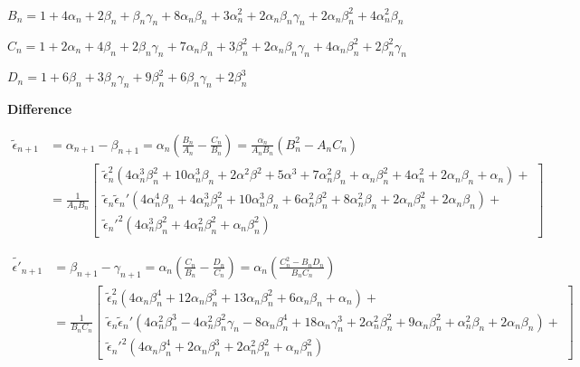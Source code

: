 $B_n = 1 + 4\alpha_n + 2\beta_n + \beta_n\gamma_n + 8\alpha_n\beta_n + 3\alpha_n^2 + 2\alpha_n\beta_n\gamma_n + 2\alpha_n\beta_n^2 + 4\alpha_n^2\beta_n$

$C_n = 1 + 2\alpha_n + 4\beta_n + 2\beta_n\gamma_n + 7\alpha_n\beta_n + 3\beta_n^2 + 2\alpha_n\beta_n\gamma_n + 4\alpha_n\beta_n^2 + 2\beta_n^2\gamma_n$


$D_n = 1 + 6\beta_n + 3\beta_n\gamma_n + 9\beta_n^2 + 6\beta_n\gamma_n + 2\beta_n^3$

\newpage

\textbf{Difference}

\begin{align*}
\tilde{\epsilon}_{n+1} &= \alpha_{n+1} - \beta_{n+1} = \alpha_n\left( \frac{B_n}{A_n} - \frac{C_n}{B_n} \right) = \frac{\alpha_n}{A_nB_n}\left( B_n^2 - A_nC_n \right)\\
&= \frac{1}{A_nB_n}\left[ 
\begin{array}{l}
\tilde{\epsilon}_n^2
(4\alpha_n^3\beta_n^2 + 10\alpha_n^3\beta_n + 2\alpha^2\beta^2 + 5\alpha^3
+ 7\alpha_n^2\beta_n + \alpha_n\beta_n^2 + 4\alpha_n^2 + 2\alpha_n\beta_n + \alpha_n)+\\
\tilde{\epsilon}_n\tilde{\epsilon}_n'
(4\alpha_n^4\beta_n + 4\alpha_n^3\beta_n^2 + 10\alpha_n^3\beta_n + 6\alpha_n^2\beta_n^2+
8\alpha_n^2\beta_n + 2\alpha_n\beta_n^2 + 2\alpha_n\beta_n)+\\
\tilde{\epsilon}_n'^2
(4\alpha_n^3\beta_n^2 + 4\alpha_n^2\beta_n^2 + \alpha_n\beta_n^2)
\end{array}\right]
\end{align*}

\begin{align*}
\tilde{\epsilon'}_{n+1} &= \beta_{n+1} - \gamma_{n+1} = \alpha_n\left( \frac{C_n}{B_n} - \frac{D_n}{C_n} \right) = \alpha_n\left( \frac{C_n^2 - B_nD_n}{B_nC_n} \right)\\
&= \frac{1}{B_nC_n}\left[
\begin{array}{l}
\tilde{\epsilon}_n^2
(4\alpha_n\beta_n^4 + 12\alpha_n\beta_n^3 + 13\alpha_n\beta_n^2 + 
6\alpha_n\beta_n + \alpha_n)+\\
\tilde{\epsilon}_n\tilde{\epsilon}_n'
(4\alpha_n^2\beta_n^3 - 4\alpha_n^2\beta_n^2\gamma_n - 8\alpha_n\beta_n^4 + 
18\alpha_n\gamma_n^3 + 2\alpha_n^2\beta_n^2 + 9\alpha_n\beta_n^2 +
\alpha_n^2\beta_n + 2\alpha_n\beta_n)+\\
\tilde{\epsilon}_n'^2
(4\alpha_n\beta_n^4 + 2\alpha_n\beta_n^3 + 2\alpha_n^2\beta_n^2 + \alpha_n\beta_n^2)
\end{array}\right]
\end{align*}

